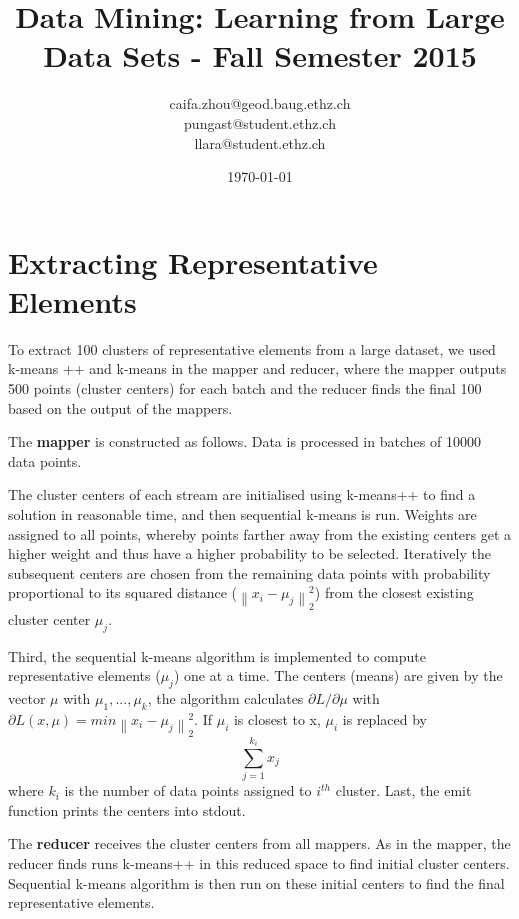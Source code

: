 \documentclass[a4paper, 11pt]{article}
\title{Data Mining: Learning from Large Data Sets - Fall Semester 2015}
\author{caifa.zhou@geod.baug.ethz.ch\\ pungast@student.ethz.ch\\ llara@student.ethz.ch\\}
\date{\today}
\begin{document}
\maketitle

\section*{Extracting Representative Elements} 

To extract 100 clusters of representative elements from a large dataset, we used k-means ++ and k-means in the mapper and reducer, where the mapper outputs 500 points (cluster centers) for each batch and the reducer finds the final 100 based on the output of the mappers.

The \textbf{mapper} is constructed as follows. Data is processed in batches of 10000 data points.

The cluster centers of each stream are initialised using k-means++ to find a solution in reasonable time, and then sequential k-means is run. Weights are assigned to all points, whereby points farther away from the existing centers get a higher weight and thus have a higher probability to be selected. Iteratively the subsequent centers are chosen from the remaining data points with probability proportional to its squared distance ($\left \| x_{i} - \mu_{j} \right \|^{2}_{2}$) from the closest existing cluster center $\mu_{j}$.

Third, the sequential k-means algorithm is implemented to compute representative elements ($\mu_{j}$) one at a time. The centers (means) are given by the vector $\mu$ with $\mu_{1},...,\mu_{k}$, the algorithm calculates $\partial L/\partial \mu$ with $ \partial L(x,\mu) = min \left \| x_{i} - \mu_{j} \right \|^{2}_{2}$. If $\mu_{i}$ is closest to x,  $\mu_{i}$ is replaced by $$\sum_{j=1}^{k_{i}}{x_{j}}$$where $k_i$ is the number of data points assigned to $i^{th}$ cluster. 
Last, the emit function prints the centers into stdout.

The \textbf{reducer} receives the cluster centers from all mappers. As in the mapper, the reducer finds runs k-means++ in this reduced space to find initial cluster centers. Sequential k-means algorithm is then run on these initial centers to find the final representative elements. \\ 
\end{document}
